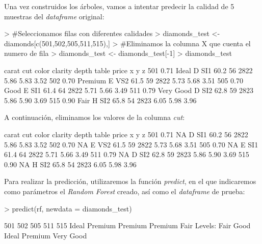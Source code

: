 \documentclass [a4paper] {article}
\begin{document}
Una vez construidos los árboles, vamos a intentar predecir la calidad de 5 muestras del \textit{dataframe} original:
\begin{Schunk}
\begin{Sinput}
> #Seleccionamos filas con diferentes calidades
> diamonds_test <- diamonds[c(501,502,505,511,515),]
> #Eliminamos la columna X que cuenta el numero de fila
> diamonds_test <- diamonds_test[-1]
> diamonds_test
\end{Sinput}
\begin{Soutput}
    carat       cut color clarity depth table price    x    y    z
501  0.71     Ideal     D     SI1  60.2    56  2822 5.86 5.83 3.52
502  0.70   Premium     E     VS2  61.5    59  2822 5.73 5.68 3.51
505  0.70      Good     E     SI1  61.4    64  2822 5.71 5.66 3.49
511  0.79 Very Good     D     SI2  62.8    59  2823 5.86 5.90 3.69
515  0.90      Fair     H     SI2  65.8    54  2823 6.05 5.98 3.96
\end{Soutput}
\end{Schunk}

A continuación, eliminamos los valores de la columna \textit{cut}:
\begin{Schunk}
\begin{Soutput}
    carat cut color clarity depth table price    x    y    z
501  0.71  NA     D     SI1  60.2    56  2822 5.86 5.83 3.52
502  0.70  NA     E     VS2  61.5    59  2822 5.73 5.68 3.51
505  0.70  NA     E     SI1  61.4    64  2822 5.71 5.66 3.49
511  0.79  NA     D     SI2  62.8    59  2823 5.86 5.90 3.69
515  0.90  NA     H     SI2  65.8    54  2823 6.05 5.98 3.96
\end{Soutput}
\end{Schunk}

Para realizar la predicción, utilizaremos la función \textit{predict}, en el que indicaremos como parámetros el \textit{Random Forest} creado, así como el \textit{dataframe} de prueba:
\begin{Schunk}
\begin{Sinput}
> predict(rf, newdata = diamonds_test)
\end{Sinput}
\begin{Soutput}
    501     502     505     511     515 
  Ideal Premium Premium Premium    Fair 
Levels: Fair Good Ideal Premium Very Good
\end{Soutput}
\end{Schunk}
\end{document}
